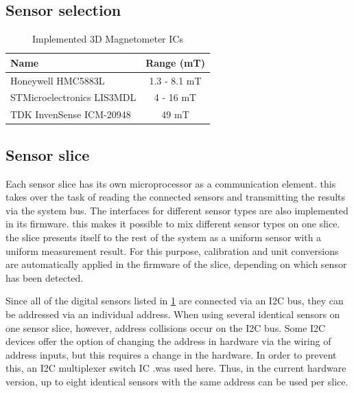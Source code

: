 \documentclass[conference]{IEEEtran}
\begin{document}
\subsection{Sensor selection}


\begin{table}
    \centering
    \begin{tabular}{|l|c|}
    \hline
    \textbf{Name} & \textbf{Range (mT)} \\
    \hline
    Honeywell HMC5883L & 1.3 - 8.1 mT \\
    STMicroelectronics LIS3MDL & 4 - 16 mT \\
    TDK InvenSense ICM-20948 & 49 mT \\
    \hline
    \end{tabular}
    \caption{Implemented 3D Magnetometer ICs}
    \label{implemented_sensors_fig}
\end{table}



\subsection{Sensor slice}

Each sensor slice has its own microprocessor as a communication element. this takes over the task of reading the connected sensors and transmitting the results via the system bus.
The interfaces for different sensor types are also implemented in its firmware. this makes it possible to mix different sensor types on one slice. the slice presents itself to the rest of the system as a uniform sensor with a uniform measurement result.
For this purpose, calibration and unit conversions are automatically applied in the firmware of the slice, depending on which sensor has been detected.

Since all of the digital sensors listed in \ref{implemented_sensors_fig} are connected via an I2C bus, they can be addressed via an individual address.
When using several identical sensors on one sensor slice, however, address collisions occur on the I2C bus. Some I2C devices offer the option of changing the address in hardware via the wiring of address inputs, but this requires a change in the hardware. 
In order to prevent this, an I2C multiplexer switch IC .was used here. Thus, in the current hardware version, up to eight identical sensors with the same address can be used per slice.
\end{document}
